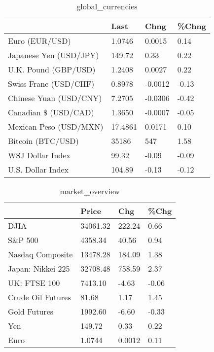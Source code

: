 \documentclass{article}%
\begin{document}
%


\begin{table}[htbp]%
\caption{global\_currencies}%
\centering%
\begin{adjustbox}{width=1\textwidth}%
\begin{tabular}{llll}
\toprule
                       &    Last &    Chng & \%Chng \\
\midrule
        Euro (EUR/USD) &  1.0746 &  0.0015 &  0.14 \\
Japanese Yen (USD/JPY) &  149.72 &    0.33 &  0.22 \\
  U.K. Pound (GBP/USD) &  1.2408 &  0.0027 &  0.22 \\
 Swiss Franc (USD/CHF) &  0.8978 & -0.0012 & -0.13 \\
Chinese Yuan (USD/CNY) &  7.2705 & -0.0306 & -0.42 \\
  Canadian \$ (USD/CAD) &  1.3650 & -0.0007 & -0.05 \\
Mexican Peso (USD/MXN) & 17.4861 &  0.0171 &  0.10 \\
     Bitcoin (BTC/USD) &   35186 &     547 &  1.58 \\
      WSJ Dollar Index &   99.32 &   -0.09 & -0.09 \\
     U.S. Dollar Index &  104.89 &   -0.13 & -0.12 \\
\bottomrule
\end{tabular}
%
\end{adjustbox}%
\end{table}

%


\begin{table}[htbp]%
\caption{market\_overview}%
\centering%
\begin{adjustbox}{width=1\textwidth}%
\begin{tabular}{llll}
\toprule
                  &    Price &    Chg &  \%Chg \\
\midrule
             DJIA & 34061.32 & 222.24 &  0.66 \\
          S\&P 500 &  4358.34 &  40.56 &  0.94 \\
 Nasdaq Composite & 13478.28 & 184.09 &  1.38 \\
Japan: Nikkei 225 & 32708.48 & 758.59 &  2.37 \\
     UK: FTSE 100 &  7413.10 &  -4.63 & -0.06 \\
Crude Oil Futures &    81.68 &   1.17 &  1.45 \\
     Gold Futures &  1992.60 &  -6.60 & -0.33 \\
              Yen &   149.72 &   0.33 &  0.22 \\
             Euro &   1.0744 & 0.0012 &  0.11 \\
\bottomrule
\end{tabular}
%
\end{adjustbox}%
\end{table}

%
\end{document}
